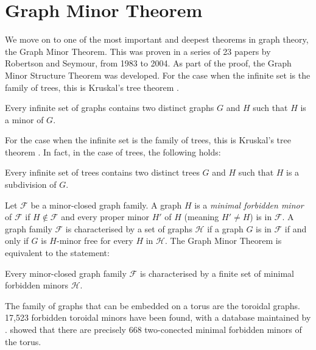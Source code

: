 \section{Graph Minor Theorem}\label{sec:Graph Minor Theorem}
We move on to one of the most important and deepest theorems in graph theory, the Graph Minor Theorem. This was proven in a series of 23 papers by Robertson and Seymour, from 1983 to 2004. As part of the proof, the Graph Minor Structure Theorem was developed. For the case when the infinite set is the family of trees, this is Kruskal's tree theorem \cite{kruskalWellQuasiOrderingTreeTheorem1960}. 
\begin{theorem}
	Every infinite set of graphs contains two distinct graphs \(G\) and \(H\) such that \(H\) is a minor of \(G\).
\end{theorem}
For the case when the infinite set is the family of trees, this is Kruskal's tree theorem \cite{kruskalWellQuasiOrderingTreeTheorem1960}. In fact, in the case of trees, the following holds:
\begin{theorem}
	Every infinite set of trees contains two distinct trees \(G\) and \(H\) such that \(H\) is a subdivision of \(G\).
\end{theorem}
Let $\mathcal{F}$ be a minor-closed graph family. A graph $H$ is a \textit{minimal forbidden minor} of $\mathcal{F}$ if $H \notin \mathcal{F}$ and every proper minor $H'$ of $H$ (meaning $H' \neq H$) is in $\mathcal{F}$. A graph family $\mathcal{F}$ is characterised by a set of graphs $\mathcal{H}$ if a graph $G$ is in $\mathcal{F}$ if and only if $G$ is $H$-minor free for every $H$ in $\mathcal{H}$. 
The Graph Minor Theorem is equivalent to the statement:
\begin{theorem}
	Every minor-closed graph family $\mathcal{F}$ is characterised by a finite set of minimal forbidden minors $\mathcal{H}$. 
\end{theorem}

The family of graphs that can be embedded on a torus are the toroidal graphs. 17,523 forbidden toroidal minors have been found, with a database maintained by \textcite{myrvoldLargeSetTorus2018}. \textcite{moharExcludedMinorsKlein2024} showed that there are precisely $668$ two-conected minimal forbidden minors of the torus.

